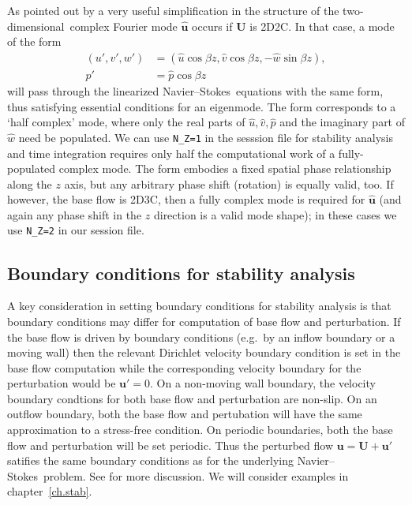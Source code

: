 \documentclass[11pt,a4paper]{report}
\newcommand\wh[1]{\widehat{#1}}
\newcommand\NavSto{Navier--Stokes}
\newcommand\LNS{linearized \NavSto}
\newcommand\twod{two-di\-men\-sion\-al}
\newcommand{\eg}{e.g.\ }
\newcommand\Ubase{{\bm{U}}}
\newcommand\upert{{\bm{u}'}}
\newcommand\uvec{\bm{u}}
\begin{document}
As pointed out by \citet{bah96} a very useful simplification in the
structure of the \twod\ complex Fourier mode $\wh{\uvec}$ occurs if
$\Ubase$ is 2D2C.  In that case, a mode of the form
\begin{align}
(u', v', w') & =
  (\hat{u}\cos\beta z, \hat{v}\cos\beta z, -\hat{w}\sin\beta z),\\
p'         & = 
   \hat{p}\cos\beta z
\end{align}
will pass through the \LNS\ equations with the same form, thus
satisfying essential conditions for an eigenmode.  The form
corresponds to a `half complex' mode, where only the real parts of
$\hat{u}, \hat{v}, \hat{p}$ and the imaginary part of $\hat{w}$ need
be populated.  We can use \verb+N_Z=1+ in the sesssion file for
stability analysis and time integration requires only half the
computational work of a fully-populated complex mode.  The form
embodies a fixed spatial phase relationship along the $z$ axis, but
any arbitrary phase shift (rotation) is equally valid, too.  If
however, the base flow is 2D3C, then a fully complex mode is required
for $\wh{\uvec}$ (and again any phase shift in the $z$ direction is a
valid mode shape); in these cases we use \verb+N_Z=2+ in our session file.

\subsection{Boundary conditions for stability analysis}
\label{sec.bcs}

A key consideration in setting boundary conditions for stability
analysis is that boundary conditions may differ for computation of
base flow and perturbation.  If the base flow is driven by boundary
conditions (\eg by an inflow boundary or a moving wall) then the
relevant Dirichlet velocity boundary condition is set in the base flow
computation while the corresponding velocity boundary for the
perturbation would be $\upert=0$.  On a non-moving wall boundary, the
velocity boundary condtions for both base flow and perturbation are
non-slip.  On an outflow boundary, both the base flow and pertubation
will have the same approximation to a stress-free condition. On
periodic boundaries, both the base flow and perturbation will be set
periodic.  Thus the perturbed flow $\bm{u}=\bm{U}+\upert$ satifies the
same boundary conditions as for the underlying \NavSto\ problem.  See
\citet{bah96} for more discussion. We will consider examples in
chapter~\ref{ch.stab}.
\end{document}
